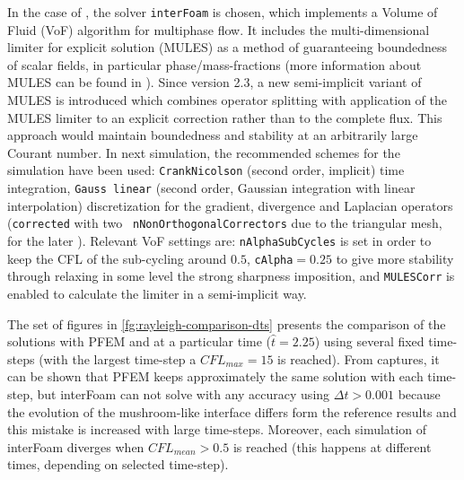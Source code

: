 In the case of \OF, the solver \texttt{interFoam} is chosen, which implements a Volume of Fluid (VoF) algorithm for multiphase flow\cite{Berberovic09}. It includes the multi-dimensional limiter for explicit solution (MULES) as a method of guaranteeing boundedness of scalar fields, in particular phase/mass-fractions (more information about MULES can be found in \cite{Marquez13}). Since \OF version 2.3, a new semi-implicit variant of MULES is introduced which combines operator splitting with application of the MULES limiter to an explicit correction rather than to the complete flux. This approach would maintain boundedness and stability at an arbitrarily large Courant number. In next simulation, the recommended schemes for the simulation have been used: \texttt{CrankNicolson} (second order, implicit) time integration, \texttt{Gauss linear} (second order, Gaussian integration with linear interpolation) discretization for the gradient, divergence and Laplacian operators (\texttt{corrected} with two \texttt{
nNonOrthogonalCorrectors} due to the triangular mesh, for the later ). Relevant VoF settings are: \texttt{nAlphaSubCycles} is set in order to keep the CFL of the sub-cycling around $0.5$, \texttt{cAlpha}$=0.25$ to give more stability through relaxing in some level the strong sharpness imposition, and \texttt{MULESCorr} is enabled to calculate the limiter in a semi-implicit way.

The set of figures in \ref{fg:rayleigh-comparison-dts} presents the comparison of the solutions with PFEM and \OF at a particular time ($\widehat{t}=2.25$) using several fixed time-steps (with the largest time-step a $CFL_{max}=15$ is reached). From captures, it can be shown that PFEM keeps approximately the same solution with each time-step, but interFoam can not solve with any accuracy using $\Delta t>0.001$ because the evolution of the mushroom-like interface differs form the reference results and this mistake is increased with large time-steps. Moreover, each simulation of interFoam diverges when $CFL_{mean}>0.5$ is reached (this happens at different times, depending on selected time-step).

